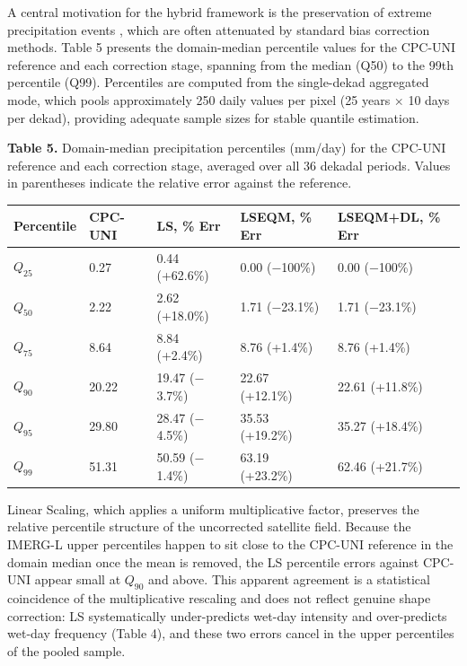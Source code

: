 \documentclass[
]{article}
\begin{document}
A central motivation for the hybrid framework is the preservation of
extreme precipitation events \cite{ref46}, which are often attenuated by
standard bias correction methods. Table 5 presents the domain-median
percentile values for the CPC-UNI reference and each correction stage,
spanning from the median (Q50) to the 99th percentile (Q99). Percentiles
are computed from the single-dekad aggregated mode, which pools
approximately 250 daily values per pixel (25 years \(\times\) 10 days
per dekad), providing adequate sample sizes for stable quantile
estimation.

\textbf{Table 5.} Domain-median precipitation percentiles (mm/day) for
the CPC-UNI reference and each correction stage, averaged over all 36
dekadal periods. Values in parentheses indicate the relative error
against the reference.

\begin{longtable}[]{@{}lllll@{}}
\toprule\noalign{}
Percentile & CPC-UNI & LS, \% Err & LSEQM, \% Err & LSEQM+DL, \% Err \\
\midrule\noalign{}
\endhead
\bottomrule\noalign{}
\endlastfoot
\(Q_{25}\) & 0.27 & 0.44 (+62.6\%) & 0.00 ($-$100\%) & 0.00 ($-$100\%) \\
\(Q_{50}\) & 2.22 & 2.62 (+18.0\%) & 1.71 ($-$23.1\%) & 1.71 ($-$23.1\%) \\
\(Q_{75}\) & 8.64 & 8.84 (+2.4\%) & 8.76 (+1.4\%) & 8.76 (+1.4\%) \\
\(Q_{90}\) & 20.22 & 19.47 ($-$3.7\%) & 22.67 (+12.1\%) & 22.61 (+11.8\%) \\
\(Q_{95}\) & 29.80 & 28.47 ($-$4.5\%) & 35.53 (+19.2\%) & 35.27 (+18.4\%) \\
\(Q_{99}\) & 51.31 & 50.59 ($-$1.4\%) & 63.19 (+23.2\%) & 62.46
(+21.7\%) \\
\end{longtable}

Linear Scaling, which applies a uniform multiplicative factor, preserves
the relative percentile structure of the uncorrected satellite field.
Because the IMERG-L upper percentiles happen to sit close to the CPC-UNI
reference in the domain median once the mean is removed, the LS
percentile errors against CPC-UNI appear small at \(Q_{90}\) and above.
This apparent agreement is a statistical coincidence of the
multiplicative rescaling and does not reflect genuine shape correction:
LS systematically under-predicts wet-day intensity and over-predicts
wet-day frequency (Table 4), and these two errors cancel in the upper
percentiles of the pooled sample.
\end{document}

